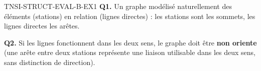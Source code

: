\begin{corrige}{TNSI-STRUCT-EVAL-B-EX1}
\textbf{Q1.} Un graphe modélisé naturellement des éléments (stations) en relation (lignes directes) : les stations sont les sommets, les lignes directes les arêtes.

\textbf{Q2.} Si les lignes fonctionnent dans les deux sens, le graphe doit être \textbf{non oriente} (une arête entre deux stations représente une liaison utilisable dans les deux sens, sans distinction de direction).
\end{corrige}

